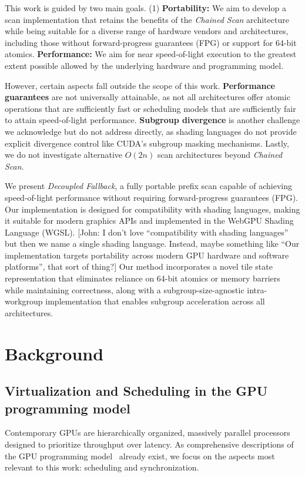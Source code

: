 \documentclass[acmsmall, manuscript, screen, review, anonymous]{acmart}
\newcommand{\john}[1]{{\footnotesize\color{cyan}[John: #1]}}
\begin{document}
This work is guided by two main goals. (1) \textbf{Portability:} We aim to develop a scan implementation that retains the benefits of the \emph{Chained Scan} architecture while being suitable for a diverse range of hardware vendors and architectures, including those without forward-progress guarantees (FPG) or support for 64-bit atomics. \textbf{Performance:} We aim for near speed-of-light execution to the greatest extent possible allowed by the underlying hardware and programming model.

However, certain aspects fall outside the scope of this work. \textbf{Performance guarantees} are not universally attainable, as not all architectures offer atomic operations that are sufficiently fast or scheduling models that are sufficiently fair to attain speed-of-light performance. \textbf{Subgroup divergence} is another challenge we acknowledge but do not address directly, as shading languages do not provide explicit divergence control like CUDA's subgroup masking mechanisms. Lastly, we do not investigate alternative $O(2n)$ scan architectures beyond \emph{Chained Scan}.

We present \emph{Decoupled Fallback}, a fully portable prefix scan capable of achieving speed-of-light performance without requiring forward-progress guarantees (FPG). Our implementation is designed for compatibility with shading languages, making it suitable for modern graphics APIs and implemented in the WebGPU Shading Language (WGSL)\@. \john{I don't love ``compatibility with shading languages'' but then we name a single shading language. Instead, maybe something like ``Our implementation targets portability across modern GPU hardware and software platforms'', that sort of thing?} Our method incorporates a novel tile state representation that eliminates reliance on 64-bit atomics or memory barriers while maintaining correctness, along with a subgroup-size-agnostic intra-workgroup implementation that enables subgroup acceleration across all architectures.

\section{Background}
\subsection{Virtualization and Scheduling in the GPU programming model}
Contemporary GPUs are hierarchically organized, massively parallel processors designed to prioritize throughput over latency. As comprehensive descriptions of the GPU programming model~\cite{10.1145/1365490.1365500} already exist, we focus on the aspects most relevant to this work: scheduling and synchronization.
\end{document}
